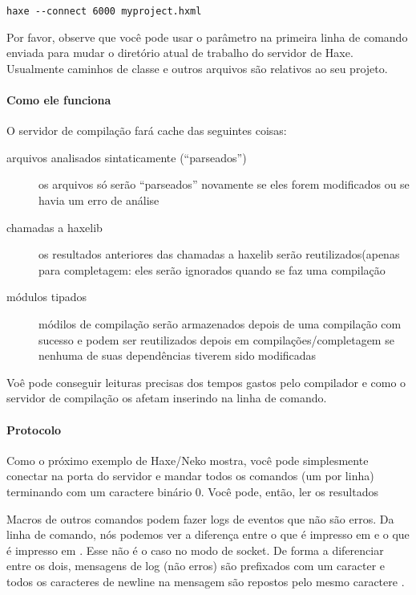 \begin{lstlisting}
haxe --connect 6000 myproject.hxml
\end{lstlisting}

Por favor, observe que você pode usar o parâmetro  na primeira linha de comando enviada para mudar o diretório atual de trabalho do servidor de Haxe. Usualmente caminhos de classe e outros arquivos são relativos ao seu projeto.

\paragraph{Como ele funciona}
O servidor de compilação fará cache das seguintes coisas:

\begin{description}
    \item[arquivos analisados sintaticamente (``parseados'')] os arquivos só serão ``parseados'' novamente se eles forem modificados ou se havia um erro de análise
    \item[chamadas a haxelib] os resultados anteriores das chamadas a haxelib serão reutilizados(apenas para completagem: eles serão ignorados quando se faz uma compilação
	\item[módulos tipados] módilos de compilação serão armazenados depois de uma compilação com sucesso e podem ser reutilizados depois em compilações/completagem se nenhuma de suas dependências tiverem sido modificadas
\end{description}

Voê pode conseguir leituras precisas dos tempos gastos pelo compilador e como o servidor de compilação os afetam inserindo  na linha de comando. 

\paragraph{Protocolo}
Como o próximo exemplo de Haxe/Neko mostra, você pode simplesmente conectar na porta do servidor e mandar todos os comandos (um por linha) terminando com um caractere binário 0. Você pode, então, ler os resultados

Macros de outros comandos podem fazer logs de eventos que não são erros. Da linha de comando, nós podemos ver a diferença entre o que é impresso em  e o que é impresso em . Esse não é o caso no modo de socket. De forma a diferenciar entre os dois, mensagens de log (não erros) são prefixados com um caracter  e todos os caracteres de newline na mensagem são repostos pelo mesmo caractere .

